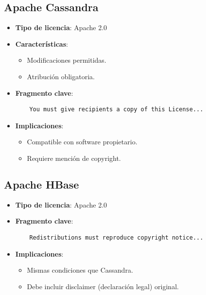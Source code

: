 \documentclass{article}
\begin{document}
\subsection{Apache Cassandra}
\begin{itemize}
    \item \textbf{Tipo de licencia}: Apache 2.0
    \item \textbf{Características}:
    \begin{itemize}
        \item Modificaciones permitidas.
        \item Atribución obligatoria.
    \end{itemize}
    \item \textbf{Fragmento clave}:
    \begin{verbatim}
    You must give recipients a copy of this License...
    \end{verbatim}
    \item \textbf{Implicaciones}:
    \begin{itemize}
        \item Compatible con software propietario.
        \item Requiere mención de copyright.
    \end{itemize}
\end{itemize}

\subsection{Apache HBase}
\begin{itemize}
    \item \textbf{Tipo de licencia}: Apache 2.0
    \item \textbf{Fragmento clave}:
    \begin{verbatim}
    Redistributions must reproduce copyright notice...
    \end{verbatim}
    \item \textbf{Implicaciones}:
    \begin{itemize}
        \item Mismas condiciones que Cassandra.
        \item Debe incluir disclaimer (declaración legal) original.
    \end{itemize}
\end{itemize}
\end{document}
